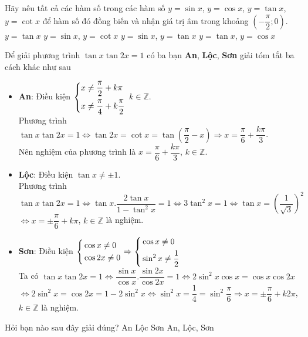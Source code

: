 \begin{ex}%
Hãy nêu tất cả các hàm số trong các hàm số $y=\sin x$, $y=\cos x$, $y=\tan x$, $y=\cot x$ để hàm số đó đồng biến và nhận giá trị âm trong khoảng $\left(-\dfrac{\pi}{2};0\right)$.
\choice
{$y=\tan x$}
{$y=\sin x$, $y=\cot x$}
{\True $y=\sin x$, $y=\tan x$}
{$y=\tan x$, $y=\cos x$}
\end{ex}

\begin{ex}%
Để giải phương trình $\tan x\tan 2x=1$ có ba bạn \textbf{An}, \textbf{Lộc}, \textbf{Sơn} giải tóm tắt ba cách khác như sau
\begin{itemize}
\item \textbf{An}: Điều kiện $\left\{\begin{aligned}& x\neq \dfrac{\pi}{2}+k\pi\\& x\neq \dfrac{\pi}{4}+k\dfrac{\pi}{2}\end{aligned}\right.$ $k\in\mathbb{Z}$.\\
Phương trình  $\tan x\tan 2x=1\Leftrightarrow \tan 2x=\cot x=\tan\left(\dfrac{\pi}{2}-x\right)\Rightarrow x=\dfrac{\pi}{6}+\dfrac{k\pi}{3}$.\\
Nên nghiệm của phương trình là $x=\dfrac{\pi}{6}+\dfrac{k\pi}{3}$, $k\in\mathbb{Z}$.
\item \textbf{Lộc}: Điều kiện $\tan x\neq \pm 1.$\\
Phương trình $\tan x\tan 2x=1\Leftrightarrow\tan x.\dfrac{2\tan x}{1-\tan^2x}=1\Leftrightarrow 3\tan^2 x=1\Leftrightarrow\tan x=\left(\dfrac{1}{\sqrt{3}}\right)^2$\\
$\Leftrightarrow x=\pm\dfrac{\pi}{6}+k\pi$, $k\in\mathbb{Z}$ là nghiệm.
\item \textbf{Sơn}: Điều kiện $\left\{\begin{aligned}& \cos x\neq 0\\& \cos 2x\neq 0\end{aligned}\right.\Rightarrow \left\{\begin{aligned}&\cos x\neq 0\\&\sin^2x\neq \dfrac{1}{2}\end{aligned}\right.$\\
Ta có $\tan x\tan 2x=1\Leftrightarrow\dfrac{\sin x}{\cos x}.\dfrac{\sin 2x}{\cos 2x}=1\Leftrightarrow 2\sin^2x\cos x=\cos x\cos 2x$\\
$\Leftrightarrow 2\sin^2x=\cos 2x=1-2\sin^2x
\Leftrightarrow \sin^2x=\dfrac{1}{4}=\sin^2\dfrac{\pi}{6}\Rightarrow x=\pm\dfrac{\pi}{6}+k2\pi$, $k\in\mathbb{Z}$ là nghiệm.
\end{itemize}
Hỏi bạn nào sau đây giải đúng?	
\choice
{An}
{\True Lộc}
{Sơn}
{An, Lộc, Sơn}
\end{ex}

